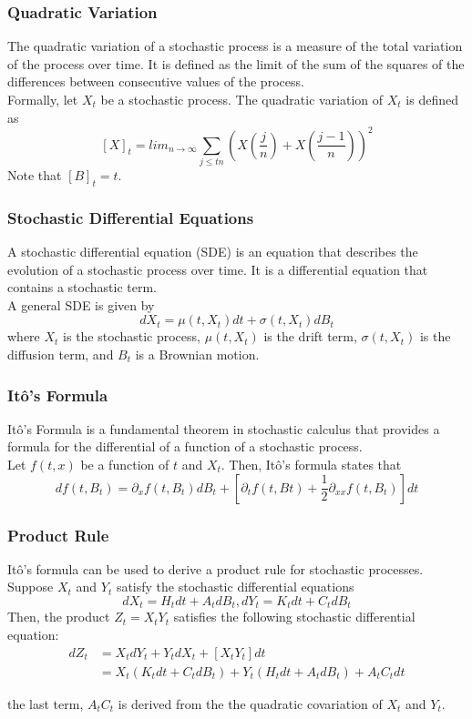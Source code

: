 \documentclass{beamer}
\begin{document}
\begin{frame}
    \frametitle{Quadratic Variation}
    The quadratic variation of a stochastic process is a measure of the total variation of the process over time. It is defined as the limit of the sum of the squares of the differences between consecutive values of the process.\\
    \vspace{0.5cm}
    Formally, let $X_t$ be a stochastic process. The quadratic variation of $X_t$ is defined as
    $$[X]_t = lim_{n \rightarrow \infty} \sum_{j \leq tn} (X(\frac{j}{n}) + X(\frac{j-1}{n}) )^2 $$
    Note that $[B]_t = t$.
\end{frame}

\begin{frame}
    \frametitle{Stochastic Differential Equations}
    A stochastic differential equation (SDE) is an equation that describes the evolution of a stochastic process over time. It is a differential equation that contains a stochastic term.\\
    \vspace{0.5cm}
    A general SDE is given by
    $$dX_t = \mu(t,X_t) dt + \sigma(t,X_t) dB_t$$
    where $X_t$ is the stochastic process, $\mu(t,X_t)$ is the drift term, $\sigma(t,X_t)$ is the diffusion term, and $B_t$ is a Brownian motion.
\end{frame}


\begin{frame}
    \frametitle{Itô's Formula}
    Itô's Formula is a fundamental theorem in stochastic calculus that provides a formula for the differential of a function of a stochastic process.\\
    \vspace{0.5cm}
    Let $f(t, x)$ be a function of $t$ and $X_t$. Then, Itô's formula states that
    $$df(t,B_t) = \partial_x f(t,B_t) dB_t + [\partial_t f(t,Bt) + \frac{1}{2}\partial_{xx}f(t,B_t)]dt $$

\end{frame}

\begin{frame}
    \frametitle{Product Rule}
    Itô's formula can be used to derive a product rule for stochastic processes.\\
    Suppose $X_t$ and $Y_t$ satisfy the stochastic differential equations
    $$dX_t = H_t dt + A_t dB_t, dY_t = K_t dt + C_t dB_t$$ 
    Then, the product $Z_t = X_t Y_t$ satisfies the following stochastic differential equation:
    \begin{align*}
        dZ_t &= X_t dY_t + Y_t dX_t + [X_t Y_t] dt\\
        &= X_t (K_t dt + C_t dB_t) + Y_t (H_t dt + A_t dB_t) + A_t C_t dt
    \end{align*}
    
    the last term, $A_t C_t$ is derived from the the quadratic covariation of $X_t$ and $Y_t$.
\end{frame}
\end{document}
